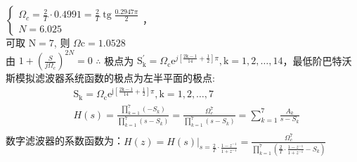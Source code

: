 \documentclass{seuer}
\begin{document}
\begin{enumerate}
	$\left\{\begin{array}{l}\Omega_c=\frac{2}{T} \cdot 0.4991=\frac{2}{T} \operatorname{tg} \frac{0.2947 \pi}{2} \\ N=6.025\end{array}\right.$，\\可取 $\mathrm{N}=7$, 则 $\Omega \mathrm{c}=1.0528$
	\\由 $1+\left(\frac{S}{j \Omega_c}\right)^{2 N}=0$
	$\therefore$ 极点为 $\mathrm{S}_{\mathrm{k}}^{\prime}=\Omega_{\mathrm{c}} \mathrm{e}^{j\left[\frac{\mathrm{2k}-1}{14}+\frac{1}{2}\right] \pi}, \mathrm{k}=1,2, \ldots, 14$，最低阶巴特沃斯模拟滤波器系统函数的极点为左半平面的极点:
	$$
	\begin{aligned}
		& \mathrm{S}_{\mathrm{k}}=\Omega_{\mathrm{c}} \mathrm{e}^{\mathrm{j}\left[\frac{2 \mathrm{k}-1}{14}+\frac{1}{2}\right] \pi}, \mathrm{k}=1,2, \ldots, 7 \\
		&H(s)=\frac{\prod_{k=1}^7(-S_k)}{\prod_{k=1}^7(s-S_k)}=\frac{\Omega_c^7}{\prod_{k=1}^7(s-S_k)}=\sum_{k=1}^7 \frac{A_k}{s-S_k} \\
	\end{aligned}
	$$
	数字滤波器的系数函数为：$ H(z)=\left.H(s)\right|_{s=\frac{2}{T} \cdot \frac{1-z^{-1}}{1+z^{-1}}}=\frac{\Omega_c^7}{\prod_{k=1}^7\left(\frac{2}{T} \cdot \frac{1-z^{-1}}{1+z^{-1}}-S_k\right)}$
\end{enumerate}
\end{document}
